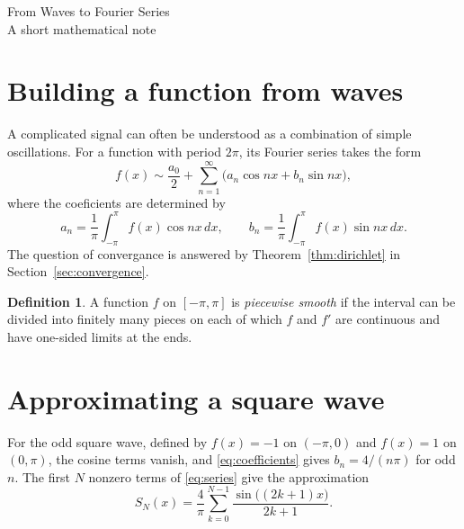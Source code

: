 \documentclass[11pt,a4paper]{article}
\theoremstyle{definition}
\newtheorem{definition}{Definition}
\begin{document}
\begin{center}
  {\LARGE From Waves to Fourier Series}\\[0.5em]
  {\small A short mathematical note}
\end{center}

\section{Building a function from waves}\label{sec:waves}
A complicated signal can often be understood as a combination
of simple oscillations. For a function with period $2\pi$,
its Fourier series takes the form
\begin{equation}\label{eq:series}
  f(x) \sim \frac{a_0}{2}
  + \sum_{n=1}^{\infty}
    \bigl(a_n\cos nx + b_n\sin nx\bigr),
\end{equation}
where the coeficients are determined by
\begin{equation}\label{eq:coefficients}
  a_n = \frac{1}{\pi}\int_{-\pi}^{\pi}f(x)\cos nx\,dx,
  \qquad
  b_n = \frac{1}{\pi}\int_{-\pi}^{\pi}f(x)\sin nx\,dx.
\end{equation}
The question of convergance is answered by
Theorem~\ref{thm:dirichlet} in Section~\ref{sec:convergence}.

\begin{definition}\label{def:piecewise}
A function $f$ on $[-\pi,\pi]$ is \emph{piecewise smooth} if the
interval can be divided into finitely many pieces on each of which
$f$ and $f'$ are continuous and have one-sided limits at the ends.
\end{definition}

\section{Approximating a square wave}\label{sec:square}
For the odd square wave, defined by $f(x)=-1$ on $(-\pi,0)$
and $f(x)=1$ on $(0,\pi)$, the cosine terms vanish, and
\eqref{eq:coefficients} gives $b_n=4/(n\pi)$ for odd $n$.
The first $N$ nonzero terms of \eqref{eq:series} give the approximation
\begin{equation}\label{eq:partial}
  S_N(x)=\frac{4}{\pi}\sum_{k=0}^{N-1}
  \frac{\sin\bigl((2k+1)x\bigr)}{2k+1}.
\end{equation}
\end{document}
